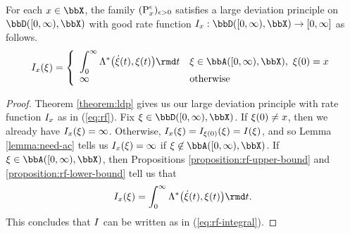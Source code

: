 \begin{theorem}
  \label{theorem:ldp-integral}
  For each $\stateVar \in \stateSpace$, the family $({\operatorname{P}}^\epsilon_x)_{\epsilon>0}$ satisfies a large deviation principle on $\pathSpace{[0,\infty)}{\stateSpace}$ with good rate function $\rf_\stateVar: \pathSpace{[0,\infty)}{\stateSpace} \rightarrow [0,\infty]$ as follows.
  \begin{equation}
    \label{eq:rf-integral}
    \rf_\stateVar(\pathVar) = \left\{\begin{array}{ll}
      \displaystyle\int_0^\infty \ode^*\big(\dot\pathVar(t), \pathVar(t)\big) \rmd t & \pathVar \in \acpathSpace{[0,\infty)}{\stateSpace}, ~ \pathVar(0) = \stateVar \\
      \infty & \text{otherwise}
    \end{array}\right.
  \end{equation}
\end{theorem}
\begin{proof}
  Theorem \ref{theorem:ldp} gives us our large deviation principle with rate function $I_x$ as in (\ref{eq:rf}).
  Fix $\pathVar \in \pathSpace{[0,\infty)}{\stateSpace}$.
  If $\xi(0) \neq x$, then we already have $I_x(\xi)=\infty$.
  Otherwise, $I_x(\xi) = I_{\xi(0)}(\xi) = I(\xi)$, and so Lemma \ref{lemma:need-ac} tells us $I_x(\xi) = \infty$ if $\pathVar \not\in \acpathSpace{[0,\infty)}{\stateSpace}$.
  If $\pathVar \in \acpathSpace{[0,\infty)}{\stateSpace}$, then Propositions \ref{proposition:rf-upper-bound} and \ref{proposition:rf-lower-bound} tell us that
  \begin{equation*}
    \rf_\stateVar(\pathVar) = \int_0^\infty \ode^*\big( \dot\pathVar(t), \pathVar(t) \big) \rmd t.
  \end{equation*}
  This concludes that $I$ can be written as in (\ref{eq:rf-integral}).
\end{proof}
